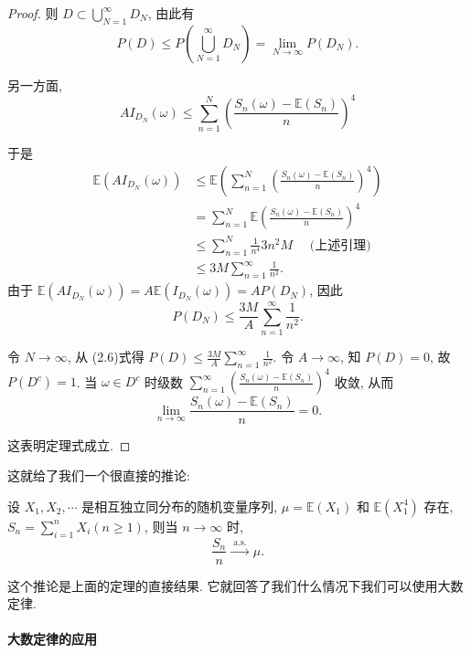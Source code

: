 {\begin{proof}
则 $D \subset \bigcup_{N=1}^{\infty} D_N$, 由此有
$$
P(D) \leq P\left(\bigcup_{N=1}^{\infty} D_N\right)=\lim _{N \rightarrow \infty} P\left(D_N\right) .
$$

另一方面, 
$$
A I_{D_N}(\omega) \leq \sum_{n=1}^N\left(\frac{S_n(\omega)-\mathbb{E}\left(S_n\right)}{n}\right)^4
$$

于是
$$
\begin{aligned}
\mathbb{E}\left(A I_{D_N}(\omega)\right) & \leq \mathbb{E}\left(\sum_{n=1}^N\left(\frac{S_n(\omega)-\mathbb{E}\left(S_n\right)}{n}\right)^4\right) \\
& =\sum_{n=1}^N \mathbb{E}\left(\frac{S_n(\omega)-\mathbb{E}\left(S_n\right)}{n}\right)^4 \\
& \leq \sum_{n=1}^N \frac{1}{n^4} 3 n^2 M \quad\text { (上述引理) } \\
& \leq 3 M \sum_{n=1}^{\infty} \frac{1}{n^2} .
\end{aligned}
$$
由于 $\mathbb{E}\left(A I_{D_N}(\omega)\right)=A \mathbb{E}\left(I_{D_N}(\omega)\right)=A P\left(D_N\right)$, 因此
$$
P\left(D_N\right) \leq \frac{3 M}{A} \sum_{n=1}^{\infty} \frac{1}{n^2} .
$$

令 $N \rightarrow \infty$, 从 (2.6)式得 $P(D) \leq \frac{3 M}{A} \sum_{n=1}^{\infty} \frac{1}{n^2}$. 令 $A \rightarrow \infty$, 知 $P(D)=0$, 故
$P\left(D^c\right)=1$. 当 $\omega \in D^c$ 时级数 $\sum_{n=1}^{\infty}\left(\frac{S_n(\omega)-\mathbb{E}\left(S_n\right)}{n}\right)^4$ 收敛, 从而
$$
\lim _{n \rightarrow \infty} \frac{S_n(\omega)-\mathbb{E}\left(S_n\right)}{n}=0 .
$$

这表明定理式成立.
\end{proof}
}

这就给了我们一个很直接的推论: 
\begin{corollary}
    设 $X_1, X_2, \cdots$ 是相互独立同分布的随机变量序列, $\mu=\mathbb{E}\left(X_1\right)$ 和 $\mathbb{E}\left(X_1^4\right)$ 存在, $S_n=\sum_{i=1}^n X_i(n \geq 1)$, 则当 $n \rightarrow \infty$ 时,
$$
\frac{S_n}{n} \stackrel{\text { a.s. }}{\longrightarrow} \mu .
$$
\end{corollary}

这个推论是上面的定理的直接结果. 它就回答了我们什么情况下我们可以使用大数定律. 

\paragraph{大数定律的应用}

